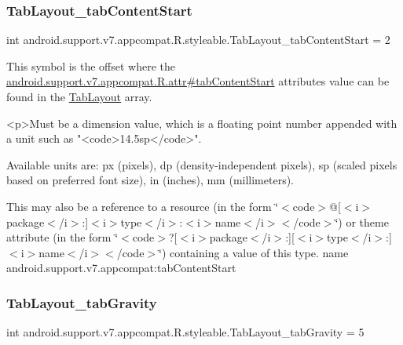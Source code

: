 \subsubsection{\texorpdfstring{Tab\+Layout\+\_\+tab\+Content\+Start}{TabLayout\_tabContentStart}}
{\footnotesize\ttfamily int android.\+support.\+v7.\+appcompat.\+R.\+styleable.\+Tab\+Layout\+\_\+tab\+Content\+Start = 2\hspace{0.3cm}{\ttfamily [static]}}

This symbol is the offset where the \hyperlink{classandroid_1_1support_1_1v7_1_1appcompat_1_1R_1_1attr_a9c7686f50ebedc57677affd040baeb34}{android.\+support.\+v7.\+appcompat.\+R.\+attr\#tab\+Content\+Start} attribute\textquotesingle{}s value can be found in the \hyperlink{classandroid_1_1support_1_1v7_1_1appcompat_1_1R_1_1styleable_a3c85d0c4cebbccf5b1a16ecfe13938ca}{Tab\+Layout} array.

\begin{DoxyVerb}      <p>Must be a dimension value, which is a floating point number appended with a unit such as "<code>14.5sp</code>".
\end{DoxyVerb}
 Available units are\+: px (pixels), dp (density-\/independent pixels), sp (scaled pixels based on preferred font size), in (inches), mm (millimeters). 

This may also be a reference to a resource (in the form \char`\"{}$<$code$>$@\mbox{[}$<$i$>$package$<$/i$>$\+:\mbox{]}$<$i$>$type$<$/i$>$\+:$<$i$>$name$<$/i$>$$<$/code$>$\char`\"{}) or theme attribute (in the form \char`\"{}$<$code$>$?\mbox{[}$<$i$>$package$<$/i$>$\+:\mbox{]}\mbox{[}$<$i$>$type$<$/i$>$\+:\mbox{]}$<$i$>$name$<$/i$>$$<$/code$>$\char`\"{}) containing a value of this type.  name android.\+support.\+v7.\+appcompat\+:tab\+Content\+Start \mbox{\label{classandroid_1_1support_1_1v7_1_1appcompat_1_1R_1_1styleable_aabd9dc95552ef0c47cbf137217540f2e}} 
\subsubsection{\texorpdfstring{Tab\+Layout\+\_\+tab\+Gravity}{TabLayout\_tabGravity}}
{\footnotesize\ttfamily int android.\+support.\+v7.\+appcompat.\+R.\+styleable.\+Tab\+Layout\+\_\+tab\+Gravity = 5\hspace{0.3cm}{\ttfamily [static]}}

